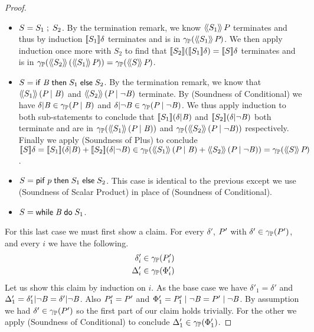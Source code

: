 \begin{proof}
\begin{itemize}
\item{} $ S = {S_1} \;;\; {S_2} $. By the termination remark, we know
$ \langle\!\langle{S_1}\rangle\!\rangle\,{P_{}} $ terminates and thus by induction
$ [\![{S_1}]\!]{\delta} $ terminates and is in
$ \gamma_{\mathbb{P}}(\langle\!\langle{S_1}\rangle\!\rangle\,{P_{}}) $. We then apply induction once more
with $S_2$ to find
that $ [\![{S_2}]\!]{\left( [\![{S_1}]\!]{\delta} \right)} = [\![{S}]\!]{\delta}
$ terminates and is in
$ \gamma_{\mathbb{P}}(\langle\!\langle{S_2}\rangle\!\rangle\,{\left( \langle\!\langle{S_1}\rangle\!\rangle\,{P_{}} \right)})
= \gamma_{\mathbb{P}}(\langle\!\langle{S}\rangle\!\rangle\,{P_{}}) $.
\item{} $ S = \mathsf{if}\;{\mathit{B}}\;\mathsf{then}\;{S_1}\;\mathsf{else}\;{S_2} $. By the termination remark, we
know that $ \langle\!\langle{S_1}\rangle\!\rangle\,{\left( P_{} \mid \mathit{B} \right)} $ and
$ \langle\!\langle{S_2}\rangle\!\rangle\,{\left( P_{} \mid \neg \mathit{B} \right)} $
terminate. By  (Soundness of Conditional) we have
$ \delta | \mathit{B} \in \gamma_{\mathbb{P}}(P_{} \mid \mathit{B}) $ and
$ \delta | \neg \mathit{B} \in \gamma_{\mathbb{P}}(P_{} \mid \neg \mathit{B})
$. We thus apply induction to both sub-statements to conclude that
$ [\![{S_1}]\!]{\left( \delta | \mathit{B}\right)} $ and
$ [\![{S_2}]\!]{\left( \delta | \neg \mathit{B}\right)} $ both terminate
and are in $ \gamma_{\mathbb{P}}(\langle\!\langle{S_1}\rangle\!\rangle\,{\left( P_{} \mid \mathit{B} \right)})
$ and $ \gamma_{\mathbb{P}}(\langle\!\langle{S_2}\rangle\!\rangle\,{\left( P_{} \mid \neg \mathit{B} \right)})
$ respectively. Finally we apply  (Soundness of
Plus) to conclude $ \pevalp{S}{\delta}
= \pevalp{S_1}{\paren{\dcond{\delta}{\bexp}}}
+ \pevalp{S_2}{\paren{\dcond{\delta}{\neg \bexp}}} \in \ppconc{\abspevalp{S_1}{\paren{\absdcond{\pp{}}{\bexp}}}
+ \abspevalp{S_2}{\paren{\absdcond{\pp{}}{\neg \bexp}}}}
= \ppconc{\abspevalp{S}{\pp{}}} $.

\item{} $ S = \mathsf{pif}\;{p}\;\mathsf{then}\;{S_1}\;\mathsf{else}\;{S_2} $. This case is identical to the
previous except we use  (Soundness of Scalar
Product) in place of  (Soundness of Conditional). 

\item{} $ S = \mathsf{while}\;{\mathit{B}}\;\mathsf{do}\;{S_1} $.
\end{itemize}
For this last case we must first show a claim. For every $ \delta' $, $
P_{}' $ with $ \delta' \in \gamma_{\mathbb{P}}(P_{}') $, and every $ i $ we have
the following.
\begin{align}
\label{lem:pp:while:claim1a} \delta'_i \in \ppconc{\pp{i}'} \\
\label{lem:pp:while:claim1b} \Delta'_i \in \ppconc{\Phi'_i}
\end{align}
Let us show this claim by induction on $ i $. As the base case we have
$ \delta'_1 = \delta' $ and $ \Delta'_1 = \delta'_1 | \neg \mathit{B}
= \delta' | \neg \mathit{B} $. Also $ P_{1}' = P_{}' $ and $ \Phi'_1
= P_{1}' \mid \neg \mathit{B} = P_{}' \mid \neg \mathit{B} $. By
assumption we had $ \delta' \in \gamma_{\mathbb{P}}(P_{}') $ so the first part of
our claim holds trivially. For the other we apply 
(Soundness of Conditional) to conclude $ \Delta'_1 \in \gamma_{\mathbb{P}}(\Phi'_1)
$.


\end{proof}
